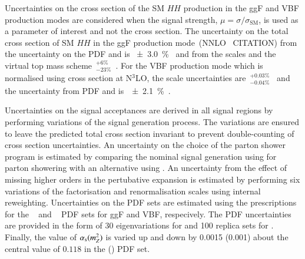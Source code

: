 Uncertainties on the cross section of the SM $HH$ production in the
ggF and VBF production modes are considered when the signal strength,
$\mu = \sigma / \sigma_{\text{SM}}$, is used as a parameter of
interest and not the cross section. The uncertainty on the total cross
section of SM $HH$ in the ggF production mode~(NNLO
\FTapprox~CITATION) from the uncertainty on the PDF and \alphas is
\SI{\pm 3.0}{\percent}~\cite{LHCHWGHH} and from the scales and the
virtual top mass scheme~$^{+6\%}_{-23\%}$~\cite{Baglio:2020wgt}. For
the VBF production mode which is normalised using cross section at
N$^3$LO, the scale uncertainties
are~$^{+0.03\%}_{-0.04\%}$~\cite{LHCHWGHH} and the uncertainty from
PDF and \alphas is~\SI{\pm 2.1}{\percent}~\cite{LHCHWGHH}.


Uncertainties on the signal acceptances are derived in all signal
regions by performing variations of the signal generation process. The
variations are ensured to leave the predicted total cross section
invariant to prevent double-counting of cross section
uncertainties. An uncertainty on the choice of the parton shower
program is estimated by comparing the nominal signal generation using
\PYTHIA[8.244] for parton showering with an alternative using
\HERWIG[7.1.6]. An uncertainty from the effect of missing higher
orders in the pertubative expansion is estimated by performing six
variations of the factorisation and renormalisation scales using
internal reweighting. Uncertainties on the PDF sets are estimated
using the prescriptions for the
\PDFforLHC[15nlo]~\cite{Butterworth:2015oua} and
\NNPDF[3.0nlo]~\cite{Ball:2014uwa} PDF sets for ggF and VBF,
respecively. The PDF uncertainties are provided in the form of 30
eigenvariations for \PDFforLHC[15nlo] and 100 replica sets for
\NNPDF[3.0nlo]. Finally, the value of $\alpha_{\text{s}}(m_{Z}^2)$ is varied up
and down by 0.0015 (0.001) about the central value of $0.118$ in the
\PDFforLHC[15nlo] (\NNPDF[3.0nlo]) PDF set.


